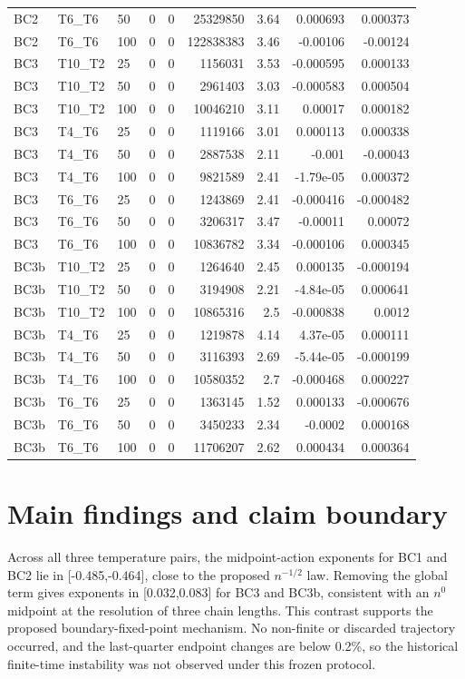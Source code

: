 \documentclass[10pt]{article}
\begin{document}
\begin{longtable}{lllrrrrrr}
BC2 & T6\_T6 & 50 & 0 & 0 & 25329850 & 3.64 & 0.000693 & 0.000373 \\
BC2 & T6\_T6 & 100 & 0 & 0 & 122838383 & 3.46 & -0.00106 & -0.00124 \\
BC3 & T10\_T2 & 25 & 0 & 0 & 1156031 & 3.53 & -0.000595 & 0.000133 \\
BC3 & T10\_T2 & 50 & 0 & 0 & 2961403 & 3.03 & -0.000583 & 0.000504 \\
BC3 & T10\_T2 & 100 & 0 & 0 & 10046210 & 3.11 & 0.00017 & 0.000182 \\
BC3 & T4\_T6 & 25 & 0 & 0 & 1119166 & 3.01 & 0.000113 & 0.000338 \\
BC3 & T4\_T6 & 50 & 0 & 0 & 2887538 & 2.11 & -0.001 & -0.00043 \\
BC3 & T4\_T6 & 100 & 0 & 0 & 9821589 & 2.41 & -1.79e-05 & 0.000372 \\
BC3 & T6\_T6 & 25 & 0 & 0 & 1243869 & 2.41 & -0.000416 & -0.000482 \\
BC3 & T6\_T6 & 50 & 0 & 0 & 3206317 & 3.47 & -0.00011 & 0.00072 \\
BC3 & T6\_T6 & 100 & 0 & 0 & 10836782 & 3.34 & -0.000106 & 0.000345 \\
BC3b & T10\_T2 & 25 & 0 & 0 & 1264640 & 2.45 & 0.000135 & -0.000194 \\
BC3b & T10\_T2 & 50 & 0 & 0 & 3194908 & 2.21 & -4.84e-05 & 0.000641 \\
BC3b & T10\_T2 & 100 & 0 & 0 & 10865316 & 2.5 & -0.000838 & 0.0012 \\
BC3b & T4\_T6 & 25 & 0 & 0 & 1219878 & 4.14 & 4.37e-05 & 0.000111 \\
BC3b & T4\_T6 & 50 & 0 & 0 & 3116393 & 2.69 & -5.44e-05 & -0.000199 \\
BC3b & T4\_T6 & 100 & 0 & 0 & 10580352 & 2.7 & -0.000468 & 0.000227 \\
BC3b & T6\_T6 & 25 & 0 & 0 & 1363145 & 1.52 & 0.000133 & -0.000676 \\
BC3b & T6\_T6 & 50 & 0 & 0 & 3450233 & 2.34 & -0.0002 & 0.000168 \\
BC3b & T6\_T6 & 100 & 0 & 0 & 11706207 & 2.62 & 0.000434 & 0.000364 \\
\bottomrule
\end{longtable}

\section*{Main findings and claim boundary}
Across all three temperature pairs, the midpoint-action exponents for BC1 and
BC2 lie in [-0.485,-0.464], close
to the proposed $n^{-1/2}$ law.  Removing the global term gives exponents in
[0.032,0.083] for BC3 and
BC3b, consistent with an $n^0$ midpoint at the resolution of three chain
lengths.  This contrast supports the proposed boundary-fixed-point mechanism.
No non-finite or discarded trajectory occurred, and the last-quarter endpoint
changes are below 0.2\%, so the historical finite-time instability was not
observed under this frozen protocol.
\end{document}
